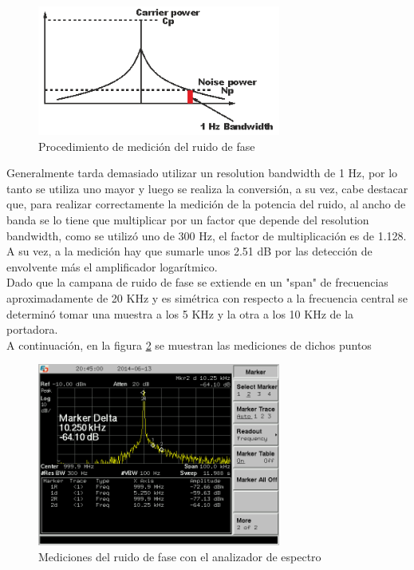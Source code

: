 \documentclass[a4paper,10pt]{article}
\begin{document}
		\begin{figure}[!htb]
			\centering
			\includegraphics[width=8cm]
			{Imagenes/PhaseNoiseMeasurement.png}
			\caption{Procedimiento de medici\'on del ruido de fase}
			\label{img:002} 
		\end{figure}

		\indent Generalmente tarda demasiado utilizar un resolution bandwidth de
		1 Hz, por lo tanto se utiliza uno mayor y luego se realiza la 
		conversi\'on, a su vez, cabe destacar que, para realizar correctamente 
		la medici\'on de la potencia del ruido, al ancho de banda se lo tiene 
		que multiplicar por un factor que depende del resolution bandwidth, como
		se utiliz\'o uno de 300 Hz, el factor de multiplicaci\'on es de 1.128.\\
		\indent A su vez, a la medici\'on hay que sumarle unos 2.51 dB por las 
		detecci\'on de envolvente m\'as el amplificador logar\'itmico.  \\
		\indent Dado que la campana de ruido de fase se extiende en un "span" de
		frecuencias aproximadamente de 20 KHz y es sim\'etrica con respecto a la
		frecuencia central se determin\'o tomar una muestra a los 5 KHz y la 
		otra a los 10 KHz de la portadora. \\
		\indent A continuaci\'on, en la figura \ref{img:003} se muestran las 
		mediciones de dichos puntos 
		
		\begin{figure}[!htb]
			\centering
			\includegraphics[width=8cm]
			{Imagenes/SCREN451.png}
			\caption{Mediciones del ruido de fase con el analizador de espectro}
			\label{img:003} 
		\end{figure}
		
\end{document}
